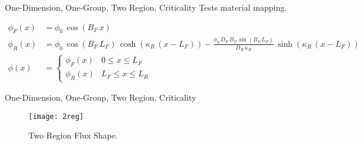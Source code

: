 \begin{frame}{One-Dimension, One-Group, Two Region, Criticality}
  Tests material mapping.
  \begin{table}
    \label{tab:2reg}
    \begin{center}
    \end{center}
  \end{table}
  \begin{align}
    \phi_F(x) &= \phi_0 \, \cos(B_F \, x) \\
    \phi_R(x) &= \phi_0 \, \cos(B_F \, L_F) \, \cosh(\kappa_R \, (x-L_F)) - 
      \frac{\phi_0 \, D_F \, B_F \, \sin(B_F\,L_F)}{D_R \, \kappa_R} \, 
      \sinh(\kappa_R\,(x-L_F)) \\
    \label{eq:analytic_2reg}
    \phi(x) &=
    \begin{cases}
      \phi_F(x) & 0   \le x \le L_F \\
      \phi_R(x) & L_F \le x \le L_R
    \end{cases}
  \end{align}
\end{frame}

\begin{frame}{One-Dimension, One-Group, Two Region, Criticality}
  \begin{figure}
    \centering
    \texttt{[image: 2reg]}
    \caption{Two Region Flux Shape.}
    \label{fig:2reg}
  \end{figure}
\end{frame}

